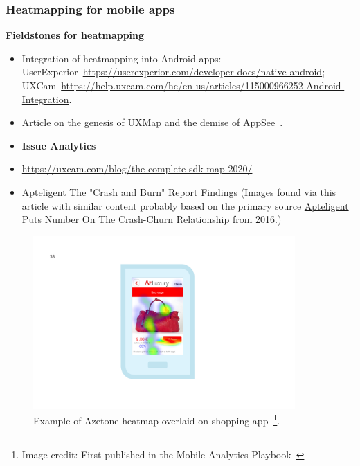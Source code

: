 
\subsubsection{Heatmapping for mobile apps}

\textbf{Fieldstones for heatmapping} 
\begin{itemize}
    \item Integration of heatmapping into Android apps: UserExperior~\url{https://userexperior.com/developer-docs/native-android}; UXCam~\url{https://help.uxcam.com/hc/en-us/articles/115000966252-Android-Integration}.
    \item Article on the genesis of UXMap and the demise of AppSee~\citep{uxcam_hackermoon_2020_heatmapping}.
    \item \textbf{Issue Analytics} 
    \item \url{https://uxcam.com/blog/the-complete-sdk-map-2020/}
    \item Apteligent \href{https://www.apmdigest.com/the-crash-and-burn-report-findings}{The "Crash and Burn" Report Findings} (Images found via this article with similar content probably based on the primary source \href{https://www.androidheadlines.com/2016/12/apteligent-puts-number-crash-churn-relationship.html}{Apteligent Puts Number On The Crash-Churn Relationship} from 2016.)
\end{itemize}

\begin{figure}[htbp!]
    \begin{minipage}{\textwidth}
    \centering
    \includegraphics[width=10cm]{images/mobile-analytics-playbook/Chart-10-azetone.png}
    \caption[Example of Azetone heatmap overlaid on shopping app]{Example of Azetone heatmap overlaid on shopping app~\footnote{Image credit: First published in the Mobile Analytics Playbook~\cite{harty_aymer_playbook_2016}}.}
    \label{fig:azetone-heatmap-example}
    \end{minipage}
\end{figure}

